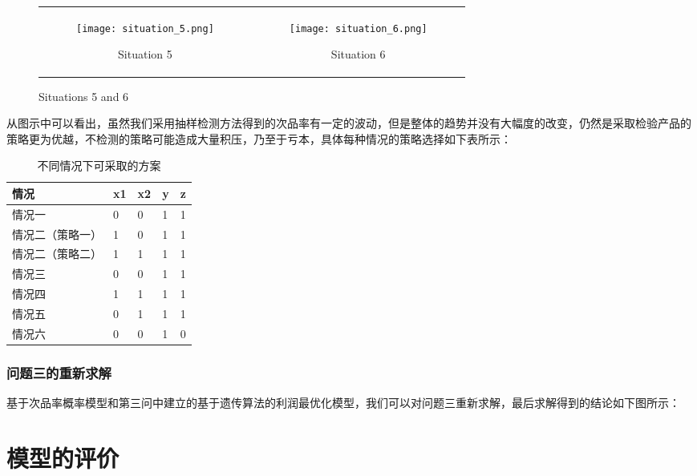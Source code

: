 \documentclass[utf8]{ctexart} %
\begin{document}
		\begin{figure}[H]
			\centering
			\begin{tabular}{cc}
				\begin{subfigure}[b]{0.45\textwidth}
					\centering
					\texttt{[image: situation\_5.png]}
					\caption{Situation 5}
				\end{subfigure} &
				\begin{subfigure}[b]{0.45\textwidth}
					\centering
					\texttt{[image: situation\_6.png]}
					\caption{Situation 6}
				\end{subfigure} \\
			\end{tabular}
			\caption{Situations 5 and 6}
		\end{figure}
		从图示中可以看出，虽然我们采用抽样检测方法得到的次品率有一定的波动，但是整体的趋势并没有大幅度的改变，仍然是采取检验产品的策略更为优越，不检测的策略可能造成大量积压，乃至于亏本，具体每种情况的策略选择如下表所示：
			\begin{table}[H]  
			\centering  
			\caption{不同情况下可采取的方案}  
			\label{tab:scenarios}  
			\begin{tabular}{p{0.2\textwidth}p{}p{}p{}p{}}  
				\toprule  
				\textbf{情况} & \textbf{x1} & \textbf{x2} & \textbf{y} & \textbf{z} \\  
				\midrule  
				情况一 & 0 & 0 & 1 & 1 \\  
				情况二（策略一） & 1 & 0 & 1 & 1 \\  
				情况二（策略二）& 1 & 1 & 1 & 1 \\  
				情况三 & 0 & 0 & 1 & 1 \\  
				情况四 & 1 & 1 & 1 & 1 \\  
				情况五 & 0 & 1 & 1 & 1 \\  
				情况六 & 0 & 0 & 1 & 0 \\  
				\bottomrule  
			\end{tabular}  
		\end{table}  
		\subsubsection{问题三的重新求解}
		
		基于次品率概率模型和第三问中建立的基于遗传算法的利润最优化模型，我们可以对问题三重新求解，最后求解得到的结论如下图所示：
		\section{模型的评价}
\end{document}
